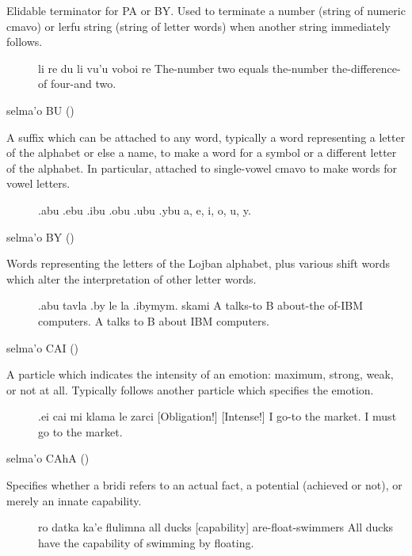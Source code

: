 Elidable terminator for PA or BY. Used to terminate a number
    (string of numeric cmavo) or lerfu string (string of letter
    words) when another string immediately follows.
\begin{description}
\item[] li re du li vu'u voboi re The-number two equals the-number the-difference-of four-and two.
\end{description}

selma'o BU () 

A suffix which can be attached to any word, typically a word
    representing a letter of the alphabet or else a name, to make a
    word for a symbol or a different letter of the alphabet. In
    particular, attached to single-vowel cmavo to make words for
    vowel letters.
\begin{description}
\item[] .abu .ebu .ibu .obu .ubu .ybu a, e, i, o, u, y.
\end{description}

selma'o BY () 

Words representing the letters of the Lojban alphabet, plus
    various shift words which alter the interpretation of other
    letter words.
\begin{description}
\item[] .abu tavla .by le la .ibymym. skami A talks-to B about-the of-IBM computers. A talks to B about IBM computers.
\end{description}

selma'o CAI () 

A particle which indicates the intensity of an emotion:
    maximum, strong, weak, or not at all. Typically follows another
    particle which specifies the emotion.
\begin{description}
\item[] .ei cai mi klama le zarci [Obligation!] [Intense!] I go-to the market. I must go to the market.
\end{description}

selma'o CAhA () 

Specifies whether a bridi refers to an actual fact, a
    potential (achieved or not), or merely an innate
    capability.
\begin{description}
\item[] ro datka ka'e flulimna all ducks [capability] are-float-swimmers All ducks have the capability of swimming by floating.
\end{description}

